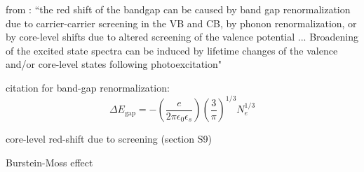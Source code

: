 from \cite{zurchUltrafastCarrierThermalization2017}: ``the red shift of the bandgap can be caused by band gap renormalization due to carrier-carrier screening in the VB and CB\cite{bennettCarrierinducedChangeRefractive1990}, by phonon renormalization, or by core-level shifts due to altered screening of the valence potential\cite{allenTemperatureDependenceDirect1983,vandrielInfluenceHotPhonons1979} ... Broadening of the excited state spectra \cite{grootCoreLevelSpectroscopy2008} can be induced by lifetime changes of the valence and/or core-level states following photoexcitation" 

citation for band-gap renormalization: \cite{bennettCarrierinducedChangeRefractive1990,spataruInitioCalculationBandgap2004,oschliesGWSelfenergyCalculations1995}
\begin{equation}
\Delta E_{\textrm{gap}} = - \left( \frac{e}{2 \pi \epsilon_0 \epsilon_s} \right) \left( \frac{3}{\pi}\right)^{1/3} N_e^{1/3}
\end{equation}

core-level red-shift due to screening \cite{schultzeAttosecondBandgapDynamics2014} (section S9)

Burstein-Moss effect







